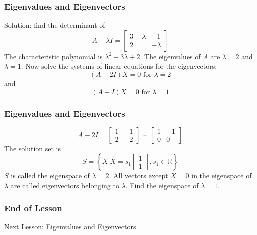 \documentclass[xcolor=dvipsnames]{beamer}
\begin{document}
\begin{frame}
  \frametitle{Eigenvalues and Eigenvectors}
  Solution: find the determinant of
  \begin{equation}
    \label{eq:aeboapai}
    A-\lambda{}I=\left[
      \begin{array}{cc}
        3-\lambda&-1\\
        2&-\lambda
      \end{array}\right]
  \end{equation}
The characteristic polynomial is $\lambda^{2}-3\lambda+2$. The
eigenvalues of $A$ are $\lambda=2$ and $\lambda=1$. Now solve the
systems of linear equations for the eigenvectors:
\begin{equation}
  \label{eq:ahquaiwi}
  (A-2I)X=0\mbox{ for }\lambda=2
\end{equation}
and
\begin{equation}
  \label{eq:eetoodai}
  (A-I)X=0\mbox{ for }\lambda=1
\end{equation}
\end{frame}

\begin{frame}
  \frametitle{Eigenvalues and Eigenvectors}
  \begin{equation}
    \label{eq:jaegheed}
    A-2I=\left[
      \begin{array}{cc}
        1&-1\\
        2&-2
      \end{array}\right]\sim\left[
      \begin{array}{cc}
        1&-1\\
        0&0
      \end{array}\right]
  \end{equation}
  The solution set is
  \begin{equation}
    \label{eq:enahvodo}
S=\left\{X|X=s_{1}\left[
    \begin{array}{c}
      1\\
      1
    \end{array}\right],s_{1}\in\mathbb{R}\right\}
\end{equation}
$S$ is called the eigenspace of $\lambda=2$. All vectors except $X=0$
in the eigenspace of $\lambda$ are called eigenvectors belonging to
$\lambda$. Find the eigenspace of $\lambda=1$.
\end{frame}

\begin{frame}
  \frametitle{End of Lesson}
Next Lesson: Eigenvalues and Eigenvectors
\end{frame}
\end{document}
